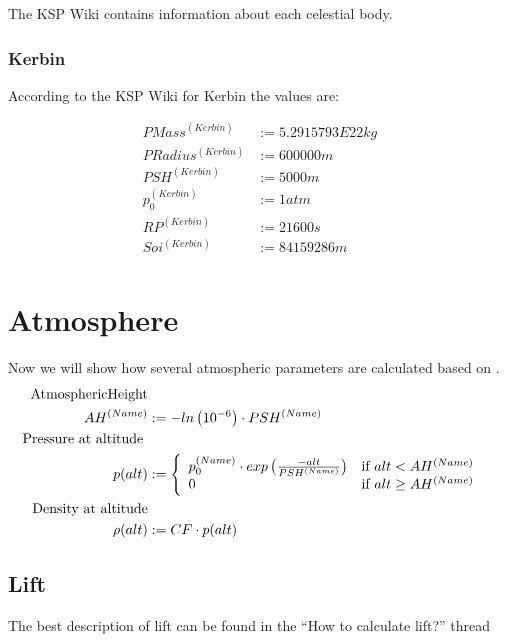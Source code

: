 \documentclass[11pt]{article}
\begin{document}
The KSP Wiki \cite{Wiki} contains information about each celestial body.

\subsubsection{Kerbin}

According to the KSP Wiki for Kerbin the values are:

\begin{align*}
  PMass^{(Kerbin)} &:= 5.2915793E22 kg\\
  PRadius^{(Kerbin)} &:= 600000 m\\
  PSH^{(Kerbin)} &:= 5000 m\\
  p_0^{(Kerbin)} &:= 1 atm\\
  RP^{(Kerbin)} &:= 21600 s\\
  Soi^{(Kerbin)} &:= 84159286 m\\
\end{align*}

\section{Atmosphere}

Now we will show how several atmospheric parameters are calculated
based on \cite{Atmo}.
\begin{align}
  \index{Atmospheric Height} \textrm{AtmosphericHeight}\nonumber\\
  AH^{(Name)} &:= -ln\left(10^{-6}\right)\cdot PSH^{(Name)}\\
  \index{Pressure} \textrm{Pressure at altitude }&\nonumber\\
  p(alt) &:=
  \left\{
      \begin{array}{l l}
        p_0^{(Name)} \cdot exp\left({\frac{-alt}{PSH^{(Name)}}}\right) & \textrm{if } alt < AH^{(Name)}\\
        0 &\textrm{if } alt \geq AH^{(Name)}
      \end{array}
    \right.\\
    \index{Density} \textrm{Density at altitude}\nonumber\\
    \rho(alt) &:= CF \cdot p(alt)
\end{align}


\subsection{Lift}

The best description of  lift can be found in the ``How to
calculate lift?'' thread \cite{Lift}
\end{document}
